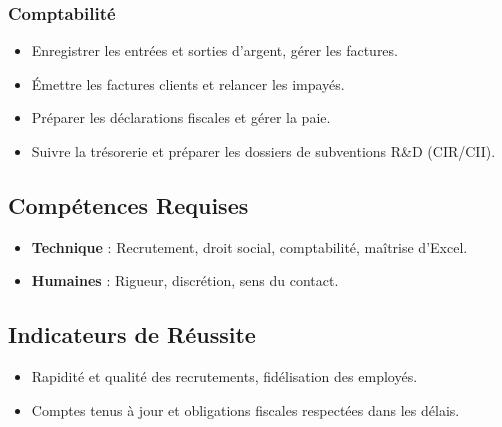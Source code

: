 \documentclass[12pt,a4paper]{article}
\begin{document}
\subsubsection{Comptabilité}
\begin{itemize}[label=\textbullet]
    \item Enregistrer les entrées et sorties d'argent, gérer les factures.
    \item Émettre les factures clients et relancer les impayés.
    \item Préparer les déclarations fiscales et gérer la paie.
    \item Suivre la trésorerie et préparer les dossiers de subventions R\&D (CIR/CII).
\end{itemize}

\subsection{Compétences Requises}
\begin{itemize}[label=\textbullet]
    \item \textbf{Technique} : Recrutement, droit social, comptabilité, maîtrise d'Excel.
    \item \textbf{Humaines} : Rigueur, discrétion, sens du contact.
\end{itemize}

\subsection{Indicateurs de Réussite}
\begin{itemize}[label=\textbullet]
    \item Rapidité et qualité des recrutements, fidélisation des employés.
    \item Comptes tenus à jour et obligations fiscales respectées dans les délais.
\end{itemize}
\end{document}
